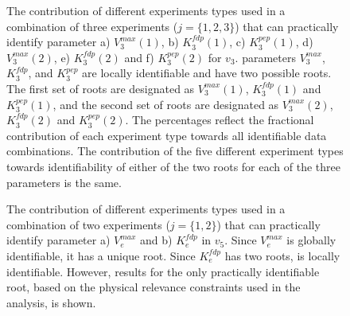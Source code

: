 \documentclass[10pt]{article}
\begin{document}
	\begin{figure}[!tbhp]
		\caption{The contribution of different experiments types used in a combination of three experiments ($j = \{1, 2, 3\}$) that can practically identify parameter a) $V_3^{max}(1)$, b) $K_3^{fdp}(1)$, c) $K_3^{pep}(1)$, d) $V_3^{max}(2)$, e) $K_3^{fdp}(2)$ and f) $K_3^{pep}(2)$ for $v_3$. parameters $V_3^{max}$, $K_3^{fdp}$, and $K_3^{pep}$ are locally identifiable and have two possible roots. The first set of roots are designated as $V_3^{max}(1)$, $K_3^{fdp}(1)$ and $K_3^{pep}(1)$, and the second set of roots are designated as $V_3^{max}(2)$, $K_3^{fdp}(2)$ and $K_3^{pep}(2)$. The percentages reflect the fractional contribution of each experiment type towards all identifiable data combinations. The contribution of the five different experiment types towards identifiability of either of the two roots for each of the three parameters is the same.}\label{fig:v3_exp_info}
	\end{figure} 

	\begin{figure}[!tbhp]
		\caption{The contribution of different experiments types used in a combination of two experiments ($j = \{1, 2\}$) that can practically identify parameter a) $V_e^{max}$ and b) $K_e^{fdp}$ in $v_5$. Since $V_e^{max}$ is globally identifiable, it has a unique root. Since $K_e^{fdp}$ has two roots, is locally identifiable. However, results for the only practically identifiable root, based on the physical relevance constraints used in the analysis, is shown.}\label{fig:v5_exp_info}
	\end{figure}
\end{document}
